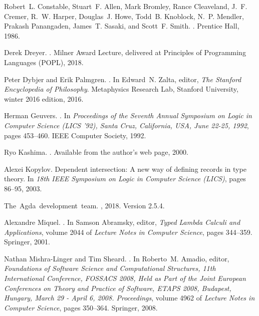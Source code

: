 \documentclass{article}
\begin{document}
\begin{thebibliography}{10}

Robert~L. Constable, Stuart~F. Allen, Mark Bromley, Rance Cleaveland, J.~F.
  Cremer, R.~W. Harper, Douglas~J. Howe, Todd~B. Knoblock, N.~P. Mendler,
  Prakash Panangaden, James~T. Sasaki, and Scott~F. Smith.
.
\newblock Prentice Hall, 1986.

Derek Dreyer.
.
\newblock Milner Award Lecture, delivered at Principles of Programming
  Languages (POPL), 2018.

Peter Dybjer and Erik Palmgren.
.
\newblock In Edward~N. Zalta, editor, {\em The Stanford Encyclopedia of
  Philosophy}. Metaphysics Research Lab, Stanford University, winter 2016
  edition, 2016.

Herman Geuvers.
.
\newblock In {\em Proceedings of the Seventh Annual Symposium on Logic in
  Computer Science {(LICS} '92), Santa Cruz, California, USA, June 22-25,
  1992}, pages 453--460. {IEEE} Computer Society, 1992.

  Ryo Kashima.
  .
  \newblock Available from the author's web page, 2000.

Alexei Kopylov.
\newblock Dependent intersection: {A} new way of defining records in type
  theory.
\newblock In {\em 18th {IEEE} Symposium on Logic in Computer Science {(LICS)}},
  pages 86--95, 2003.

\mbox{The Agda development team}.
, 2018.
\newblock Version 2.5.4.

Alexandre Miquel.
.
\newblock In Samson Abramsky, editor, {\em {Typed Lambda Calculi and
  Applications}}, volume 2044 of {\em Lecture Notes in Computer Science}, pages
  344--359. Springer, 2001.

Nathan Mishra{-}Linger and Tim Sheard.
.
\newblock In Roberto~M. Amadio, editor, {\em Foundations of Software Science
  and Computational Structures, 11th International Conference, {FOSSACS} 2008,
  Held as Part of the Joint European Conferences on Theory and Practice of
  Software, {ETAPS} 2008, Budapest, Hungary, March 29 - April 6, 2008.
  Proceedings}, volume 4962 of {\em Lecture Notes in Computer Science}, pages
  350--364. Springer, 2008.


\end{thebibliography}
\end{document}
